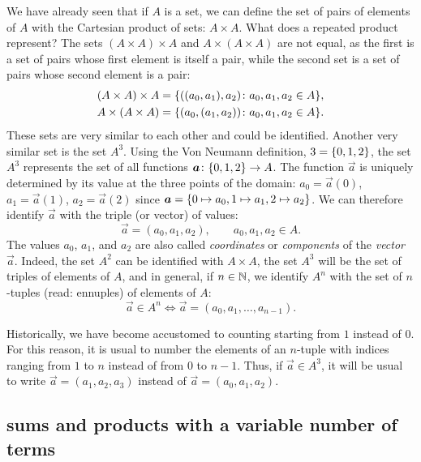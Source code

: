 We have already seen that if $A$ is a set, we can define the set 
of pairs of elements of $A$ with the Cartesian product of sets: 
$A\times A$. 
What does a repeated product represent?
The sets $(A\times A)\times A$ and $A\times(A\times A)$ are not 
equal, as the first is a set of pairs whose first element 
is itself a pair, while the second set is a set of pairs 
whose second element is a pair:
\begin{gather*}
  (A\times A)\times A = {\left\{ ((a_0,a_1),a_2)\colon a_0,a_1,a_2\in A \right\}},
  \\
  A \times (A\times A) = {\left\{ (a_0,(a_1,a_2))\colon a_0,a_1,a_2\in A \right\}}.
\end{gather*}
These sets are very similar to each other and could be identified.
Another very similar set is the set $A^{3}$.  
Using the Von Neumann definition, $3 = {\left\{ 0,1,2 \right\}}$, the set 
$A^{3}$ represents the set of all functions 
$\boldsymbol a\colon {\left\{ 0,1,2 \right\}}\to A$.
The function $\vec a$ is uniquely determined by its value at the 
three points of the domain: $a_0 = \vec a(0)$, $a_1=\vec a(1)$, $a_2=\vec a(2)$
since $\boldsymbol a = {\left\{ 0\mapsto a_0, 1\mapsto a_1, 2\mapsto a_2 \right\}}$.
We can therefore identify $\vec a$ with the triple (or vector) of values:
\[
  \vec a = (a_0, a_1, a_2), \qquad a_0,a_1,a_2 \in A.  
\]
The values $a_0$, $a_1$, and $a_2$ are also called \emph{coordinates}
or \emph{components} of the \emph{vector} $\vec a$.
%
%
%
%
%
Indeed, the set $A^{2}$ can be identified with $A\times A$, the set 
$A^{3}$ will be the set of triples of elements of $A$, and in general, if
$n\in{\mathbb N}$,
we identify $A^{n}$ with the set of $n$-tuples (read: ennuples) of elements 
%
of $A$:%
%
\[
   \vec a \in A^{n} \iff 
   \vec a = (a_0, a_1, \dots, a_{n-1}).  
\]

Historically, we have become accustomed to counting starting from $1$ instead of
$0$.
For this reason, it is usual to number the elements of an $n$-tuple with indices
ranging from $1$ to $n$ instead of from $0$ to $n-1$.
Thus, if $\vec a \in A^{3}$, it will be usual to write 
$\vec a = (a_1, a_2, a_3)$ instead of $\vec a = (a_0, a_1, a_2)$.

\subsection{sums and products with a variable number of terms}
%
%

